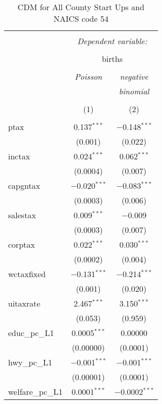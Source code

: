 
\begin{table}[!htbp] \centering 
  \caption{CDM for All County Start Ups and NAICS code 54} 
  \label{} 
\begin{tabular}{@{\extracolsep{5pt}}lcc} 
\\[-1.8ex]\hline 
\hline \\[-1.8ex] 
 & \multicolumn{2}{c}{\textit{Dependent variable:}} \\ 
\cline{2-3} 
\\[-1.8ex] & \multicolumn{2}{c}{births} \\ 
\\[-1.8ex] & \textit{Poisson} & \textit{negative} \\ 
 & \textit{} & \textit{binomial} \\ 
\\[-1.8ex] & (1) & (2)\\ 
\hline \\[-1.8ex] 
 ptax & 0.137$^{***}$ & $-$0.148$^{***}$ \\ 
  & (0.001) & (0.022) \\ 
  inctax & 0.024$^{***}$ & 0.062$^{***}$ \\ 
  & (0.0004) & (0.007) \\ 
  capgntax & $-$0.020$^{***}$ & $-$0.083$^{***}$ \\ 
  & (0.0003) & (0.006) \\ 
  salestax & 0.009$^{***}$ & $-$0.009 \\ 
  & (0.0003) & (0.007) \\ 
  corptax & 0.022$^{***}$ & 0.030$^{***}$ \\ 
  & (0.0002) & (0.004) \\ 
  wctaxfixed & $-$0.131$^{***}$ & $-$0.214$^{***}$ \\ 
  & (0.001) & (0.020) \\ 
  uitaxrate & 2.467$^{***}$ & 3.150$^{***}$ \\ 
  & (0.053) & (0.959) \\ 
  educ\_pc\_L1 & 0.0005$^{***}$ & 0.00000 \\ 
  & (0.00000) & (0.0001) \\ 
  hwy\_pc\_L1 & $-$0.001$^{***}$ & $-$0.001$^{***}$ \\ 
  & (0.00001) & (0.0001) \\ 
  welfare\_pc\_L1 & 0.0001$^{***}$ & $-$0.0002$^{***}$ \\ 

\end{tabular}
\end{table}
